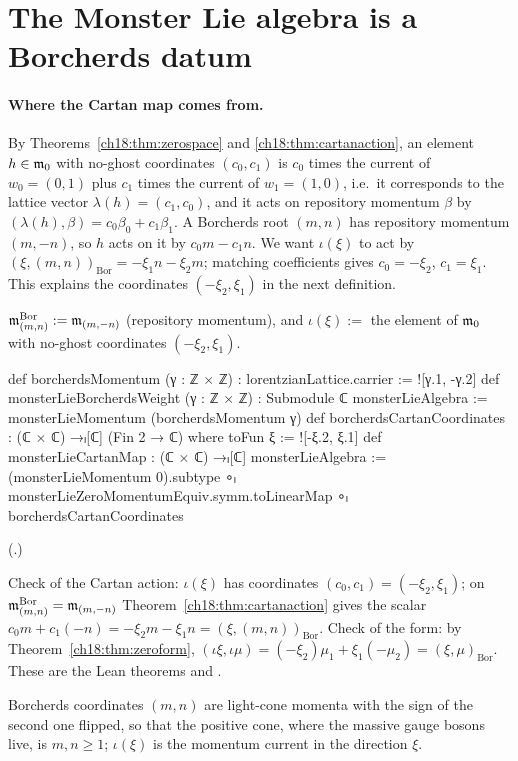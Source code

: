 \section{The Monster Lie algebra is a Borcherds datum}\label{ch18:sec:monsterbd}

\paragraph{Where the Cartan map comes from.}  By Theorems~\ref{ch18:thm:zerospace} and \ref{ch18:thm:cartanaction}, an element $h\in\mathfrak{m}_0$
with no-ghost coordinates $(c_0,c_1)$ is $c_0$ times the current of $w_0=(0,1)$ plus $c_1$ times the current of $w_1=(1,0)$, i.e.\ it
corresponds to the lattice vector $\lambda(h)=(c_1,c_0)$, and it acts on repository momentum $\beta$ by $(\lambda(h),\beta)=c_0\beta_0+c_1\beta_1$.  A
Borcherds root $(m,n)$ has repository momentum $(m,-n)$, so $h$ acts on it by $c_0m-c_1n$.  We want $\iota(\xi)$ to act by
$(\xi,(m,n))_{\mathrm{Bor}}=-\xi_1n-\xi_2m$; matching coefficients gives $c_0=-\xi_2$, $c_1=\xi_1$.  This explains the coordinates
$(-\xi_2,\xi_1)$ in the next definition.

\begin{definition}\label{ch18:def:monstercoords}
$\mathfrak{m}_{(m,n)}^{\mathrm{Bor}}:=\mathfrak{m}_{(m,-n)}$ (repository momentum), and $\iota(\xi):=$ the element of $\mathfrak{m}_0$ with no-ghost coordinates
$(-\xi_2,\xi_1)$.
\end{definition}
\begin{leancode}
def borcherdsMomentum (γ : ℤ × ℤ) : lorentzianLattice.carrier := ![γ.1, -γ.2]
def monsterLieBorcherdsWeight (γ : ℤ × ℤ) : Submodule ℂ monsterLieAlgebra :=
  monsterLieMomentum (borcherdsMomentum γ)
def borcherdsCartanCoordinates : (ℂ × ℂ) →ₗ[ℂ] (Fin 2 → ℂ) where
  toFun ξ := ![-ξ.2, ξ.1]
def monsterLieCartanMap : (ℂ × ℂ) →ₗ[ℂ] monsterLieAlgebra :=
  (monsterLieMomentum 0).subtype ∘ₗ monsterLieZeroMomentumEquiv.symm.toLinearMap ∘ₗ
    borcherdsCartanCoordinates
\end{leancode}
(.)
\begin{dictionary}
Check of the Cartan action: $\iota(\xi)$ has coordinates $(c_0,c_1)=(-\xi_2,\xi_1)$; on $\mathfrak{m}^{\mathrm{Bor}}_{(m,n)}=\mathfrak{m}_{(m,-n)}$
Theorem~\ref{ch18:thm:cartanaction} gives the scalar $c_0m+c_1(-n)=-\xi_2m-\xi_1n=(\xi,(m,n))_{\mathrm{Bor}}$.  Check of the form: by
Theorem~\ref{ch18:thm:zeroform}, $(\iota\xi,\iota\mu)=(-\xi_2)\mu_1+\xi_1(-\mu_2)=(\xi,\mu)_{\mathrm{Bor}}$.  These are the Lean theorems
 and .
\end{dictionary}
\begin{physics}
Borcherds coordinates $(m,n)$ are light-cone momenta with the sign of the second one flipped, so that the
positive cone, where the massive gauge bosons live, is $m,n\ge1$; $\iota(\xi)$ is the momentum current in the direction $\xi$.
\end{physics}

